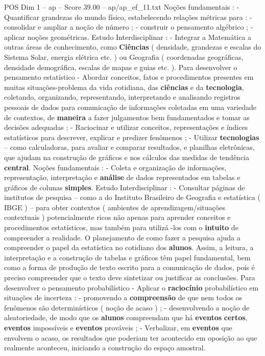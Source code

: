 \begin{textsample}{POS Dim 1 – ap – Score 39.00 – ap/ap\_ef\_11.txt}
Noções fundamentais : - Quantificar grandezas do mundo físico, estabelecendo relações métricas para : - consolidar e ampliar a noção de número ; - construir o pensamento algébrico ; - aplicar noções geométricas.
Estudo Interdisciplinar : - Integrar a Matemática a outras áreas de conhecimento, como \textbf{Ciências} ( densidade, grandezas e escalas do Sistema Solar, energia elétrica etc. ) ou Geografia ( coordenadas geográficas, densidade demográfica, escalas de mapas e guias etc. ).
Para desenvolver o pensamento estatístico - Abordar conceitos, fatos e procedimentos presentes em muitas situações-problema da vida cotidiana, das \textbf{ciências} e da \textbf{tecnologia}, coletando, organizando, representando, interpretando e analisando registros pessoais de dados para comunicação de informações coletadas em uma variedade de contextos, de \textbf{maneira} a fazer julgamentos bem fundamentados e tomar as decisões adequadas ; - Raciocinar e utilizar conceitos, representações e índices estatísticos para descrever, explicar e predizer fenômenos ; - Utilizar \textbf{tecnologias} – como calculadoras, para avaliar e comparar resultados, e planilhas eletrônicas, que ajudam na construção de gráficos e nos cálculos das medidas de tendência \textbf{central}.
Noções fundamentais : - Coleta e organização de informações, representação, interpretação e \textbf{análise} de dados representados em tabelas e gráficos de colunas \textbf{simples}.
Estudo Interdisciplinar : - Consultar páginas de institutos de pesquisa – como a do Instituto Brasileiro de Geografia e estatística ( IBGE ) – para obter contextos ( ambientes de aprendizagem/situações contextuais ) potencialmente ricos não apenas para aprender conceitos e procedimentos estatísticos, mas também para utilizá -los com o \textbf{intuito} de compreender a realidade.
O planejamento de como fazer a pesquisa ajuda a compreender o papel da estatística no cotidiano dos \textbf{alunos}.
Assim, a leitura, a interpretação e a construção de tabelas e gráficos têm papel fundamental, bem como a forma de produção de texto escrito para a comunicação de dados, pois é preciso compreender que o texto deve sintetizar ou justificar as conclusões.
Para desenvolver o pensamento probabilístico - Aplicar o \textbf{raciocínio} probabilístico em situações de incerteza : - promovendo a \textbf{compreensão} de que nem todos os fenômenos são determinísticos ( noção de acaso ) ; - desenvolvendo a noção de aleatoriedade, de modo que os \textbf{alunos} compreendam que há \textbf{eventos} \textbf{certos}, \textbf{eventos} impossíveis e \textbf{eventos} prováveis ; - Verbalizar, em \textbf{eventos} que envolvem o acaso, os resultados que poderiam ter acontecido em oposição ao que realmente aconteceu, iniciando a construção do espaço amostral.

\end{textsample}
